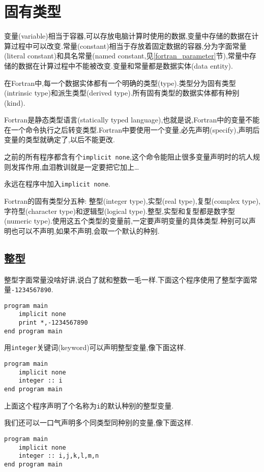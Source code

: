 \chapter{固有类型}\label{fortran_intrinsic_type}

变量(variable)相当于容器,可以存放电脑计算时使用的数据,变量中存储的数据在计算过程中可以改变.常量(constant)相当于存放着固定数据的容器,分为字面常量(literal constant)和具名常量(named constant,见\ref{fortran_parameter}节),常量中存储的数据在计算过程中不能被改变.变量和常量都是数据实体(data entity).

在Fortran中,每一个数据实体都有一个明确的类型(type).类型分为固有类型(intrinsic type)和派生类型(derived type).所有固有类型的数据实体都有种别(kind).

Fortran是静态类型语言(statically typed language),也就是说,Fortran中的变量不能在一个命令执行之后转变类型.Fortran中要使用一个变量,必先声明(specify),声明后变量的类型就确定了,以后不能更改.

之前的所有程序都含有个\texttt{implicit none},这个命令能阻止很多变量声明时的坑人规则发挥作用,血泪教训就是一定要把它加上\dots

\begin{convention}
    永远在程序中加入\texttt{implicit none}.
\end{convention}

Fortran的固有类型分五种: 整型(integer type),实型(real type),复型(complex type),字符型(character type)和逻辑型(logical type).整型,实型和复型都是数字型(numeric type).使用这五个类型的变量前,一定要声明变量的具体类型.种别可以声明也可以不声明,如果不声明,会取一个默认的种别.

\section{整型}

整型字面常量没啥好讲,说白了就和整数一毛一样.下面这个程序使用了整型字面常量\texttt{-1234567890}.
\begin{lstlisting}
program main
    implicit none
    print *,-1234567890
end program main
\end{lstlisting}

用\texttt{integer}关键词(keyword)可以声明整型变量,像下面这样.
\begin{lstlisting}
program main
    implicit none
    integer :: i
end program main
\end{lstlisting}

上面这个程序声明了个名称为\texttt{i}的默认种别的整型变量.

我们还可以一口气声明多个同类型同种别的变量,像下面这样.
\begin{lstlisting}
program main
    implicit none
    integer :: i,j,k,l,m,n
end program main
\end{lstlisting}


